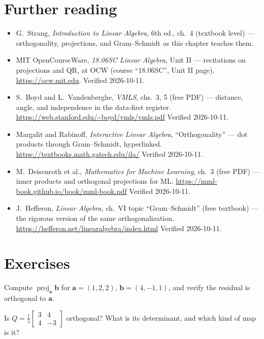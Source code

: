 \section*{Further reading}

\begin{itemize}
\item G.~Strang, \emph{Introduction to Linear Algebra}, 6th ed., ch.~4
(textbook level) --- orthogonality, projections, and Gram--Schmidt as
this chapter teaches them.
\item MIT OpenCourseWare, \emph{18.06SC Linear Algebra}, Unit II ---
recitations on projections and QR, at OCW (course ``18.06SC'', Unit
II page), \url{https://ocw.mit.edu}. Verified 2026-10-11.
\item S.~Boyd and L.~Vandenberghe, \emph{VMLS}, chs.~3, 5 (free PDF) ---
distance, angle, and independence in the data-first register.\newline
\url{https://web.stanford.edu/~boyd/vmls/vmls.pdf}
Verified 2026-10-11.
\item Margalit and Rabinoff, \emph{Interactive Linear Algebra},
``Orthogonality'' --- dot products through Gram--Schmidt,
hyperlinked.\newline
\url{https://textbooks.math.gatech.edu/ila/}
Verified 2026-10-11.
\item M.~Deisenroth et al., \emph{Mathematics for Machine Learning},
ch.~3 (free PDF) --- inner products and orthogonal projections for ML.
\newline
\url{https://mml-book.github.io/book/mml-book.pdf}
Verified 2026-10-11.
\item J.~Hefferon, \emph{Linear Algebra}, ch.~VI topic ``Gram--Schmidt''
(free textbook) --- the rigorous version of the same
orthogonalization.\newline
\url{https://hefferon.net/linearalgebra/index.html}
Verified 2026-10-11.
\end{itemize}

\section*{Exercises}

\begin{exercise}[easy]
Compute $\operatorname{proj}_{\mathbf a}\mathbf b$ for
$\mathbf a=(1,2,2)$, $\mathbf b=(4,-1,1)$, and verify the residual is
orthogonal to $\mathbf a$.
\end{exercise}

\begin{exercise}[easy]
Is $Q=\frac{1}{5}\begin{bmatrix}3&4\\4&-3\end{bmatrix}$ orthogonal? What is
its determinant, and which kind of map is it?
\end{exercise}

